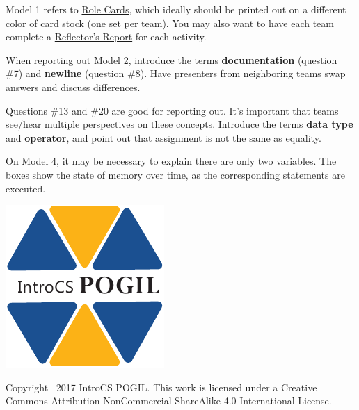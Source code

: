 \documentclass[12pt]{article}
\begin{document}
\bigskip
Model 1 refers to \href{https://github.com/ChrisMayfield/cspogil/blob/master/Handouts/role-cards-mayfield.pdf}{Role Cards}, which ideally should be printed out on a different color of card stock (one set per team). You may also want to have each team complete a \href{https://github.com/ChrisMayfield/cspogil/blob/master/Handouts/reflectors-report.pdf}{Reflector's Report} for each activity.

\bigskip
When reporting out Model 2, introduce the terms \textbf{documentation} (question \#7) and \textbf{newline} (question \#8). Have presenters from neighboring teams swap answers and discuss differences.

\bigskip
Questions \#13 and \#20 are good for reporting out. It's important that teams see/hear multiple perspectives on these concepts. Introduce the terms \textbf{data type} and \textbf{operator}, and point out that assignment is not the same as equality.

\bigskip
On Model 4, it may be necessary to explain there are only two variables. The boxes show the state of memory over time, as the corresponding statements are executed.

\normalcolor
\fi

\vfill
\vspace{1em}
\begin{minipage}{0.10\linewidth}
\includegraphics[width=\linewidth]{../IntroCS.pdf}
\end{minipage}
\hfill
\begin{minipage}{0.88\linewidth}
Copyright \textcopyright\ 2017 IntroCS POGIL.
This work is licensed under a Creative Commons Attribution-NonCommercial-ShareAlike 4.0 International License.
\end{minipage}

\clearpage




\smallskip

\end{document}
